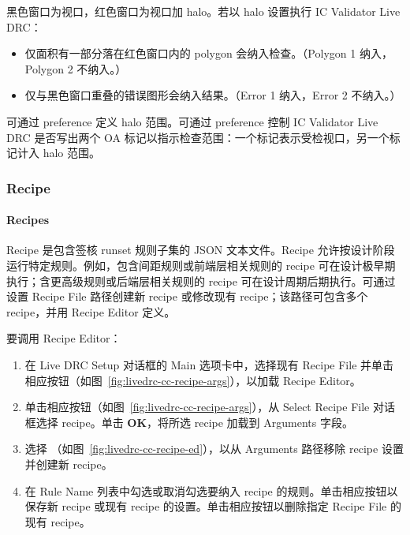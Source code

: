 
黑色窗口为视口，红色窗口为视口加 halo。若以 halo 设置执行 IC Validator Live DRC：
\begin{itemize}
  \item 仅面积有一部分落在红色窗口内的 polygon 会纳入检查。（Polygon 1 纳入，Polygon 2 不纳入。）
  \item 仅与黑色窗口重叠的错误图形会纳入结果。（Error 1 纳入，Error 2 不纳入。）
\end{itemize}

可通过 preference  定义 halo 范围。可通过 preference  控制 IC Validator Live DRC 是否写出两个 OA 标记以指示检查范围：一个标记表示受检视口，另一个标记计入 halo 范围。

\subsubsection{Recipe}
\paragraph*{Recipes}

Recipe 是包含签核 runset 规则子集的 JSON 文本文件。Recipe 允许按设计阶段运行特定规则。例如，包含间距规则或前端层相关规则的 recipe 可在设计极早期执行；含更高级规则或后端层相关规则的 recipe 可在设计周期后期执行。可通过设置 Recipe File 路径创建新 recipe 或修改现有 recipe；该路径可包含多个 recipe，并用 Recipe Editor 定义。

要调用 Recipe Editor：
\begin{enumerate}
  \item 在 Live DRC Setup 对话框的 Main 选项卡中，选择现有 Recipe File 并单击相应按钮（如图~\ref{fig:livedrc-cc-recipe-args}），以加载 Recipe Editor。
  \item 单击相应按钮（如图~\ref{fig:livedrc-cc-recipe-args}），从 Select Recipe File 对话框选择 recipe。单击 \textbf{OK}，将所选 recipe 加载到 Arguments 字段。
\end{enumerate}


\begin{enumerate}
  \setcounter{enumi}{2}
  \item 选择 （如图~\ref{fig:livedrc-cc-recipe-ed}），以从 Arguments 路径移除 recipe 设置并创建新 recipe。
  \item 在 Rule Name 列表中勾选或取消勾选要纳入 recipe 的规则。单击相应按钮以保存新 recipe 或现有 recipe 的设置。单击相应按钮以删除指定 Recipe File 的现有 recipe。
\end{enumerate}

